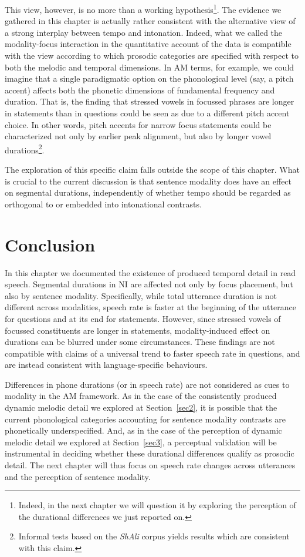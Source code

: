 This view, however, is no more than a working hypothesis\footnote{Indeed, in the next chapter we will question it by exploring the perception of the durational differences we just reported on.}. The evidence we gathered in this chapter is actually rather consistent with the alternative view of a strong interplay between tempo and intonation. Indeed, what we called the modality-focus interaction in the quantitative account of the data is compatible with the view according to which prosodic categories are specified with respect to both the melodic and temporal dimensions. In AM terms, for example, we could imagine that a single paradigmatic option on the phonological level (say, a pitch accent) affects both the phonetic dimensions of fundamental frequency and duration. That is, the finding that stressed vowels in focussed phrases are longer in statements than in questions could be seen as due to a different pitch accent choice. In other words, pitch accents for narrow focus statements could be characterized not only by earlier peak alignment, but also by longer vowel durations\footnote{Informal tests based on the \textit{ShAli} corpus \citep{niebuhr2011shapers} yields results which are consistent with this claim.}. 

The exploration of this specific claim falls outside the scope of this chapter. What is crucial to the current discussion is that sentence modality does have an effect on segmental durations, independently of whether tempo should be regarded as orthogonal to or embedded into intonational contrasts. 

\section{Conclusion}\label{sec46}
In this chapter we documented the existence of produced temporal detail in read speech. Segmental durations in NI are affected not only by focus placement, but also by sentence modality. Specifically, while total utterance duration is not different across modalities, speech rate is faster at the beginning of the utterance for questions and at its end for statements. However, since stressed vowels of focussed constituents are longer in statements, modality-induced effect on durations can be blurred under some circumstances. These findings are not compatible with claims of a universal trend to faster speech rate in questions, and are instead consistent with language-specific behaviours. 

Differences in phone durations (or in speech rate) are not considered as cues to modality in the AM framework. As in the case of the consistently produced dynamic melodic detail we explored at Section~\ref{sec2}, it is possible that the current phonological categories accounting for sentence modality contrasts are phonetically underspecified. And, as in the case of the perception of dynamic melodic detail we explored at Section~\ref{sec3}, a perceptual validation will be instrumental in deciding whether these durational differences qualify as prosodic detail. The next chapter will thus focus on speech rate changes across utterances and the perception of sentence modality.

